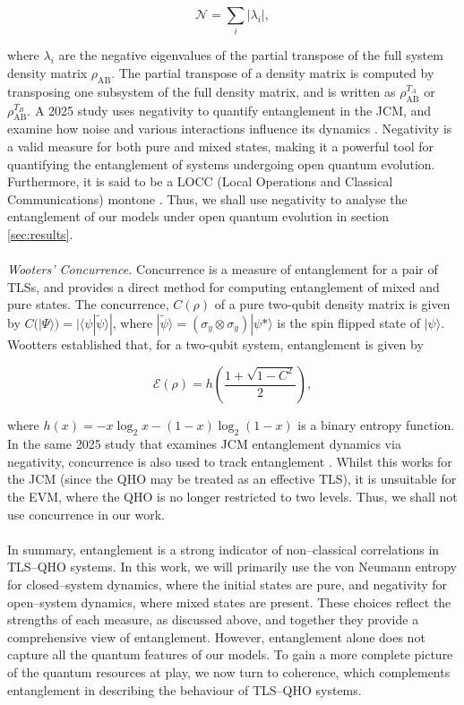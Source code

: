 \documentclass[11pt]{article}
\begin{document}
\begin{equation} \label{vne_eqn}
    \mathcal{N} = \sum_i |\lambda_i|,
\end{equation}

where $\lambda_i$ are the negative eigenvalues of the partial transpose of the full system density matrix $\rho_{\scriptscriptstyle \text{AB}}$. The partial transpose of a density matrix is computed by transposing one subsystem of the full density matrix, and is written as $\rho_{\scriptscriptstyle \text{AB}}^{T_A}$ or $\rho_{\scriptscriptstyle \text{AB}}^{T_B}$. A 2025 study uses negativity to quantify entanglement in the JCM, and examine how noise and various interactions influence its dynamics \cite{Entanglement2025-Negativity}. Negativity is a valid measure for both pure and mixed states, making it a powerful tool for quantifying the entanglement of systems undergoing open quantum evolution. Furthermore, it is said to be a LOCC (Local Operations and Classical Communications) montone \cite{Entanglement2009-Definition}. Thus, we shall use negativity to analyse the entanglement of our models under open quantum evolution in section \ref{sec:results}. \\
\\
\textit{Wooters' Concurrence.} Concurrence is a measure of entanglement for a pair of TLSs, and provides a direct method for computing entanglement of mixed and pure states. The concurrence, $C(\rho)$ of a pure two-qubit density matrix is given by $C(|\Psi\rangle) = |\langle\psi|\tilde{\psi}\rangle|$, where $|\tilde{\psi}\rangle = (\sigma_y\otimes\sigma_y)|\psi*\rangle$ is the spin flipped state of $|\psi\rangle$. Wootters established that, for a two-qubit system, entanglement is given by

\begin{equation}
    \mathcal{E}(\rho) = h\left(\frac{1+\sqrt{1-C^2}}{2}\right),
\end{equation} 

where $h(x) = - x\log_2x - (1 - x)\log_2(1 -x)$ is a binary entropy function. In the same 2025 study that examines JCM entanglement dynamics via negativity, concurrence is also used to track entanglement \cite{Entanglement2025-Negativity}. Whilst this works for the JCM (since the QHO may be treated as an effective TLS), it is unsuitable for the EVM, where the QHO is no longer restricted to two levels. Thus, we shall not use concurrence in our work.\\
\\
In summary, entanglement is a strong indicator of non--classical correlations in TLS--QHO systems. In this work, we will primarily use the von Neumann entropy for closed--system dynamics, where the initial states are pure, and negativity for open--system dynamics, where mixed states are present. These choices reflect the strengths of each measure, as discussed above, and together they provide a comprehensive view of entanglement. However, entanglement alone does not capture all the quantum features of our models. To gain a more complete picture of the quantum resources at play, we now turn to coherence, which complements entanglement in describing the behaviour of TLS--QHO systems.
\end{document}
